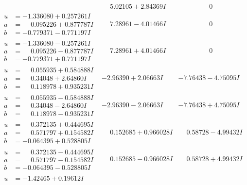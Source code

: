 \documentclass[1p]{elsarticle_modified}
\theoremstyle{definition}
\begin{document}
$$\begin{array}{c|c|c}
 & \phantom{-}5.02105 + 2.84369 I & \phantom{-0.000000 } 0 \\ \hline\begin{aligned}
u &= -1.336080 + 0.257261 I \\
a &= \phantom{-}0.095226 + 0.877787 I \\
b &= -0.779371 - 0.771197 I\end{aligned}
 & \phantom{-}7.28961 - 4.01466 I & \phantom{-0.000000 } 0 \\ \hline\begin{aligned}
u &= -1.336080 - 0.257261 I \\
a &= \phantom{-}0.095226 - 0.877787 I \\
b &= -0.779371 + 0.771197 I\end{aligned}
 & \phantom{-}7.28961 + 4.01466 I & \phantom{-0.000000 } 0 \\ \hline\begin{aligned}
u &= \phantom{-}0.055935 + 0.584888 I \\
a &= \phantom{-}0.34048 + 2.64860 I \\
b &= \phantom{-}0.118978 + 0.935231 I\end{aligned}
 & -2.96390 + 2.06663 I & -7.76438 - 4.75095 I \\ \hline\begin{aligned}
u &= \phantom{-}0.055935 - 0.584888 I \\
a &= \phantom{-}0.34048 - 2.64860 I \\
b &= \phantom{-}0.118978 - 0.935231 I\end{aligned}
 & -2.96390 - 2.06663 I & -7.76438 + 4.75095 I \\ \hline\begin{aligned}
u &= \phantom{-}0.372135 + 0.444695 I \\
a &= \phantom{-}0.571797 + 0.154582 I \\
b &= -0.064395 + 0.528805 I\end{aligned}
 & \phantom{-}0.152685 + 0.966028 I & \phantom{-}0.58728 - 4.99432 I \\ \hline\begin{aligned}
u &= \phantom{-}0.372135 - 0.444695 I \\
a &= \phantom{-}0.571797 - 0.154582 I \\
b &= -0.064395 - 0.528805 I\end{aligned}
 & \phantom{-}0.152685 - 0.966028 I & \phantom{-}0.58728 + 4.99432 I \\ \hline\begin{aligned}
u &= -1.42465 + 0.19612 I \\

\end{aligned}
\end{array}$$
\end{document}
